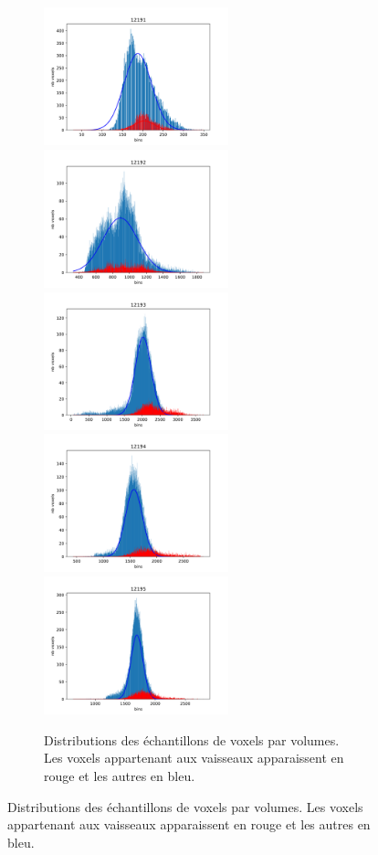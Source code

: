 \begin{figure}[h]
  \centering
  \begin{subfigure}{\textwidth}
    \centering
    \includegraphics[height=4cm]{Images/gen_12191.pdf}
    \includegraphics[height=4cm]{Images/gen_12192.pdf}
    \includegraphics[height=4cm]{Images/gen_12193.pdf}
    \includegraphics[height=4cm]{Images/gen_12194.pdf}
    \includegraphics[height=4cm]{Images/gen_12195.pdf}

  \caption{Distributions des échantillons de voxels par volumes. Les voxels appartenant aux vaisseaux apparaissent en rouge et les autres en bleu.}
  \end{subfigure}


\end{figure}
